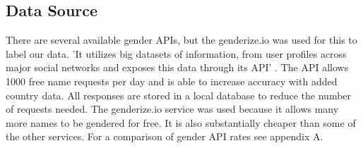 \documentclass[12pt]{article}
\begin{document}
\subsection{Data Source}
There are several available gender APIs, but the genderize.io was used for this to label our data. 'It utilizes big datasets of information, from user profiles across major social networks and exposes this data through its API' \cite{WEBSITE:GENDER1}. The API allows 1000 free name requests per day and is able to increase accuracy with added country data. All responses are stored in a local database to reduce the number of requests needed. The genderize.io service was used because it allows many more names to be gendered for free. It is also substantially cheaper than some of the other services. For a comparison of gender API rates see appendix A.

\end{document}
